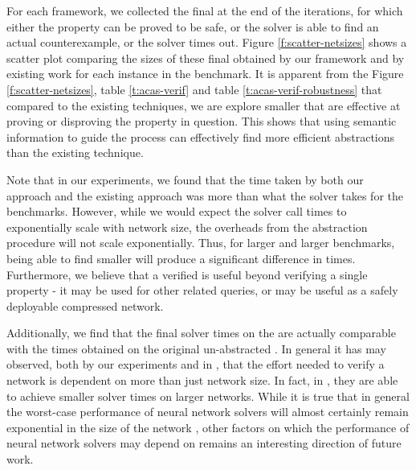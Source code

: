 For each framework, we collected the final \abs at the end of the \cegar
iterations, for which either the property can be proved to be safe, or 
the solver is able to find an actual counterexample, or the solver times out.  
Figure \ref{f:scatter-netsizes} shows a scatter plot comparing the sizes of these final \abs
obtained by our framework and by existing work \cite{cegar-nn} for each instance
in the benchmark. It is apparent from the Figure \ref{f:scatter-netsizes}, 
table \ref{t:acas-verif} and table \ref{t:acas-verif-robustness} that compared 
to the existing techniques, we are explore smaller \abs that are effective 
at proving or disproving the property in question.
This shows that using semantic information to guide the \cegar process can
effectively find more efficient abstractions than the existing technique.

Note that in our experiments, we found that the time taken by both our \cegar
approach and the existing \cegar approach \cite{cegar-nn} was more than what the
\neuralsat solver takes for the \acasxu benchmarks. However, while we would
expect the solver call times to exponentially scale with network size, the
overheads from the abstraction procedure will not scale exponentially. Thus, for
larger and larger benchmarks, being able to find smaller \abs will produce a
significant difference in times. Furthermore, we believe that a verified \abs is
useful beyond verifying a single property - it may be used for other related
queries, or may be useful as a safely deployable compressed network.

Additionally, we find that the final solver times on the \abs are actually
comparable with the times obtained on the original un-abstracted \cnc. In
general it has may observed, both by our experiments and in \cite{cegar-nn},
that the effort needed to verify a network is dependent
on more than just network size. In fact, in \cite{cegar-nn},
they are able to achieve smaller solver times on larger networks. 
While it is true that in general the worst-case performance of neural network
solvers will almost certainly remain exponential in the size of the network
\cite{reluplex}, other factors on which the performance of neural network
solvers may depend on remains an interesting direction of future work. 

